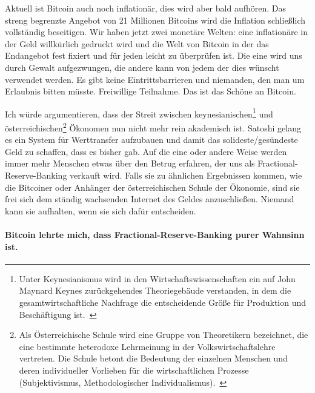Aktuell ist Bitcoin auch noch inflationär, dies wird aber bald aufhören. Das
streng begrenzte Angebot von 21 Millionen Bitcoins wird die Inflation
schließlich vollständig beseitigen. Wir haben jetzt zwei monetäre Welten: eine
inflationäre in der Geld willkürlich gedruckt wird und die Welt von Bitcoin in
der das Endangebot fest fixiert und für jeden leicht zu überprüfen ist. Die eine
wird uns durch Gewalt aufgezwungen, die andere kann von jedem der dies wünscht
verwendet werden. Es gibt keine Eintrittsbarrieren und niemanden, den man um
Erlaubnis bitten müsste. Freiwillige Teilnahme. Das ist das Schöne an Bitcoin.

Ich würde argumentieren, dass der Streit zwischen keynesianischen\footnote{Unter
Keynesianismus wird in den Wirtschaftswissenschaften ein auf John Maynard Keynes
zurückgehendes Theoriegebäude verstanden, in dem die gesamtwirtschaftliche
Nachfrage die entscheidende Größe für Produktion und Beschäftigung
ist.~\cite{wiki:keynesian}} und österreichischen\footnote{Als Österreichische
Schule wird eine Gruppe von Theoretikern bezeichnet, die eine bestimmte
heterodoxe Lehrmeinung in der Volkswirtschaftslehre vertreten. Die Schule betont
die Bedeutung der einzelnen Menschen und deren individueller Vorlieben für die
wirtschaftlichen Prozesse (Subjektivismus, Methodologischer
Individualismus).~\cite{wiki:austrian}} Ökonomen nun nicht mehr rein akademisch
ist. Satoshi gelang es ein System für Werttransfer aufzubauen und
damit das solideste/gesündeste Geld zu schaffen, dass es bisher gab. Auf die
eine oder andere Weise werden immer mehr Menschen etwas über den Betrug
erfahren, der uns als Fractional-Reserve-Banking verkauft wird. Falls sie zu
ähnlichen Ergebnissen kommen, wie die Bitcoiner oder Anhänger der
österreichischen Schule der Ökonomie, sind sie frei sich dem ständig wachsenden
Internet des Geldes anzuschließen. Niemand kann sie aufhalten, wenn sie sich
dafür entscheiden.

\paragraph{Bitcoin lehrte mich, dass Fractional-Reserve-Banking purer Wahnsinn ist.}

%
%
%
%
%

